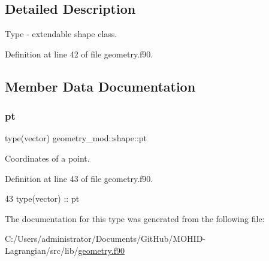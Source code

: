 \subsection{Detailed Description}
Type -\/ extendable shape class. 

Definition at line 42 of file geometry.\+f90.



\subsection{Member Data Documentation}
\mbox{\label{structgeometry__mod_1_1shape_a4c7824c0af103efbef53cbcacb9a5de0}} 
\subsubsection{\texorpdfstring{pt}{pt}}
{\footnotesize\ttfamily type(vector) geometry\+\_\+mod\+::shape\+::pt\hspace{0.3cm}{\ttfamily [private]}}



Coordinates of a point. 



Definition at line 43 of file geometry.\+f90.


\begin{DoxyCode}
43         \textcolor{keywordtype}{type}(vector) :: pt
\end{DoxyCode}


The documentation for this type was generated from the following file\+:\begin{DoxyCompactItemize}
\item 
C\+:/\+Users/administrator/\+Documents/\+Git\+Hub/\+M\+O\+H\+I\+D-\/\+Lagrangian/src/lib/\mbox{\hyperlink{geometry_8f90}{geometry.\+f90}}\end{DoxyCompactItemize}
